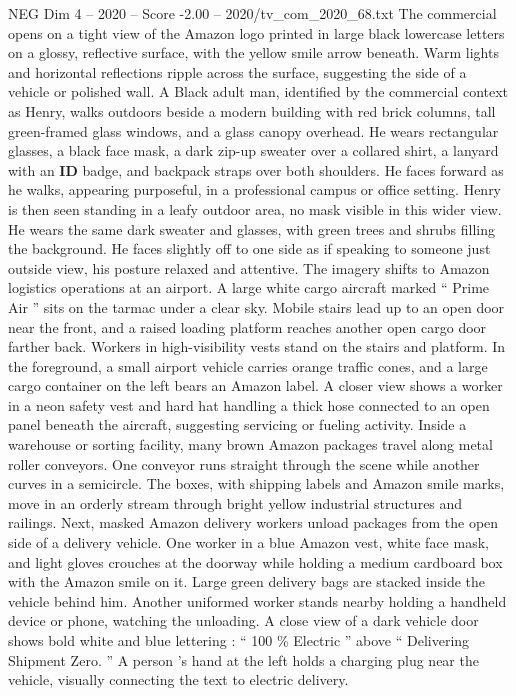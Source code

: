 \begin{textsample}{NEG Dim 4 – 2020 – Score -2.00 – 2020/tv\_com\_2020\_68.txt}  \label{ex:f4_neg_082}
The commercial opens on a tight view of the Amazon logo printed in large black lowercase letters on a glossy, reflective surface, with the yellow smile arrow beneath.
Warm lights and horizontal reflections ripple across the surface, suggesting the side of a vehicle or polished wall.
A Black adult man, identified by the commercial context as Henry, walks outdoors beside a modern building with red brick columns, tall green-framed glass windows, and a glass canopy overhead.
He wears rectangular glasses, a black face mask, a dark zip-up sweater over a collared shirt, a lanyard with an \textbf{ID} badge, and backpack straps over both shoulders.
He faces forward as he walks, appearing purposeful, in a professional campus or office setting.
Henry is then seen standing in a leafy outdoor area, no mask visible in this wider view.
He wears the same dark sweater and glasses, with green trees and shrubs filling the background.
He faces slightly off to one side as if speaking to someone just outside view, his posture relaxed and attentive.
The imagery shifts to Amazon logistics operations at an airport.
A large white cargo aircraft marked “ Prime Air ” sits on the tarmac under a clear sky.
Mobile stairs lead up to an open door near the front, and a raised loading platform reaches another open cargo door farther back.
Workers in high-visibility vests stand on the stairs and platform.
In the foreground, a small airport vehicle carries orange traffic cones, and a large cargo container on the left bears an Amazon label.
A closer view shows a worker in a neon safety vest and hard hat handling a thick hose connected to an open panel beneath the aircraft, suggesting servicing or fueling activity.
Inside a warehouse or sorting facility, many brown Amazon packages travel along metal roller conveyors.
One conveyor runs straight through the scene while another curves in a semicircle.
The boxes, with shipping labels and Amazon smile marks, move in an orderly stream through bright yellow industrial structures and railings.
Next, masked Amazon delivery workers unload packages from the open side of a delivery vehicle.
One worker in a blue Amazon vest, white face mask, and light gloves crouches at the doorway while holding a medium cardboard box with the Amazon smile on it.
Large green delivery bags are stacked inside the vehicle behind him.
Another uniformed worker stands nearby holding a handheld device or phone, watching the unloading.
A close view of a dark vehicle door shows bold white and blue lettering : “ 100 \% Electric ” above “ Delivering Shipment Zero. ” A person ’s hand at the left holds a charging plug near the vehicle, visually connecting the text to electric delivery.

\end{textsample}
